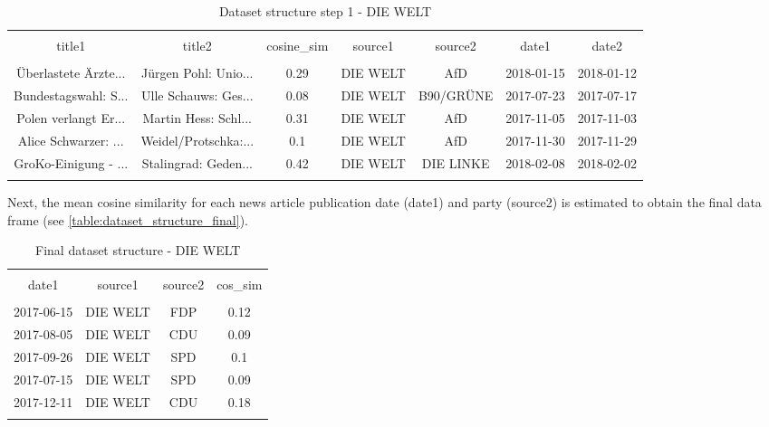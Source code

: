 \documentclass[
]{article}
\begin{document}
\begin{table}[!htbp] \centering 
  \caption{Dataset structure step 1 - DIE WELT} 
  \label{table:dataset_structure1} 
\tiny 
\begin{tabular}{@{\extracolsep{5pt}} ccccccc} 
\\[-1.8ex]\hline 
\hline \\[-1.8ex] 
title1 & title2 & cosine\_sim & source1 & source2 & date1 & date2 \\ 
\hline \\[-1.8ex] 
Überlastete Ärzte... & Jürgen Pohl: Unio... & 0.29 & DIE WELT & AfD & 2018-01-15 & 2018-01-12 \\ 
Bundestagswahl: S... & Ulle Schauws: Ges... & 0.08 & DIE WELT & B90/GRÜNE & 2017-07-23 & 2017-07-17 \\ 
Polen verlangt Er... & Martin Hess: Schl... & 0.31 & DIE WELT & AfD & 2017-11-05 & 2017-11-03 \\ 
Alice Schwarzer: ... & Weidel/Protschka:... & 0.1 & DIE WELT & AfD & 2017-11-30 & 2017-11-29 \\ 
GroKo-Einigung - ... & Stalingrad: Geden... & 0.42 & DIE WELT & DIE LINKE & 2018-02-08 & 2018-02-02 \\ 
\hline \\[-1.8ex] 
\end{tabular} 
\end{table}

Next, the mean cosine similarity for each news article publication date
(date1) and party (source2) is estimated to obtain the final data frame
(see \autoref{table:dataset_structure_final}).

\begin{table}[!htbp] \centering 
  \caption{Final dataset structure - DIE WELT} 
  \label{table:dataset_structure_final} 
\tiny 
\begin{tabular}{@{\extracolsep{5pt}} cccc} 
\\[-1.8ex]\hline 
\hline \\[-1.8ex] 
date1 & source1 & source2 & cos\_sim \\ 
\hline \\[-1.8ex] 
2017-06-15 & DIE WELT & FDP & 0.12 \\ 
2017-08-05 & DIE WELT & CDU & 0.09 \\ 
2017-09-26 & DIE WELT & SPD & 0.1 \\ 
2017-07-15 & DIE WELT & SPD & 0.09 \\ 
2017-12-11 & DIE WELT & CDU & 0.18 \\ 
\hline \\[-1.8ex] 
\end{tabular} 
\end{table}
\end{document}

